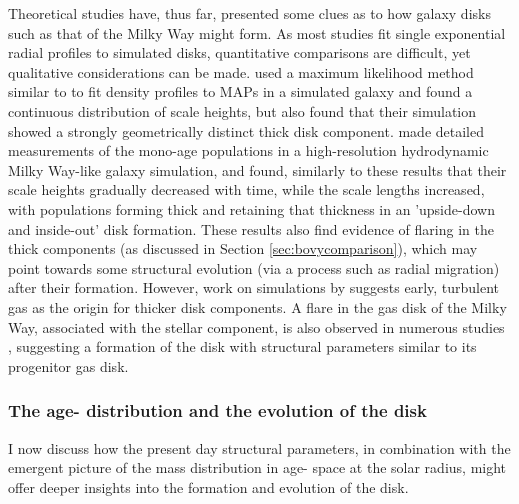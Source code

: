Theoretical studies have, thus far, presented some clues as to how galaxy disks such as that of the Milky Way might form. As most studies fit single exponential radial profiles to simulated disks, quantitative comparisons are difficult, yet qualitative considerations can be made. \citet{2013MNRAS.436..625S} used a maximum likelihood method similar to \citet{2012ApJ...753..148B} to fit density profiles to MAPs in a simulated galaxy and found a continuous distribution of scale heights, but also found that their simulation showed a strongly geometrically distinct thick disk component. \citet{2013ApJ...773...43B} made detailed measurements of the mono-age populations in a high-resolution hydrodynamic Milky Way-like galaxy simulation, and found, similarly to these results that their scale heights gradually decreased with time, while the scale lengths increased, with populations forming thick and retaining that thickness in an 'upside-down and inside-out' disk formation. These results also find evidence of flaring in the thick components (as discussed in Section \ref{sec:bovycomparison}), which may point towards some structural evolution (via a process such as radial migration) after their formation. However, work on simulations by \citet{2009ApJ...707L...1B}  suggests early, turbulent gas as the origin for thicker disk components. A flare in the gas disk of the Milky Way, associated with the stellar component, is also observed in numerous studies \citep[e.g.][]{2014Natur.509..342F,2014ApJ...794...90K,1963SvA.....6..658L}, suggesting a formation of the disk with structural parameters similar to its progenitor gas disk.
 
\subsubsection{The age-\feh{} distribution and the evolution of the disk}
I now discuss how the present day structural parameters, in combination with the emergent picture of the mass distribution in age-\feh{} space at the solar radius, might offer deeper insights into the formation and evolution of the disk. 

